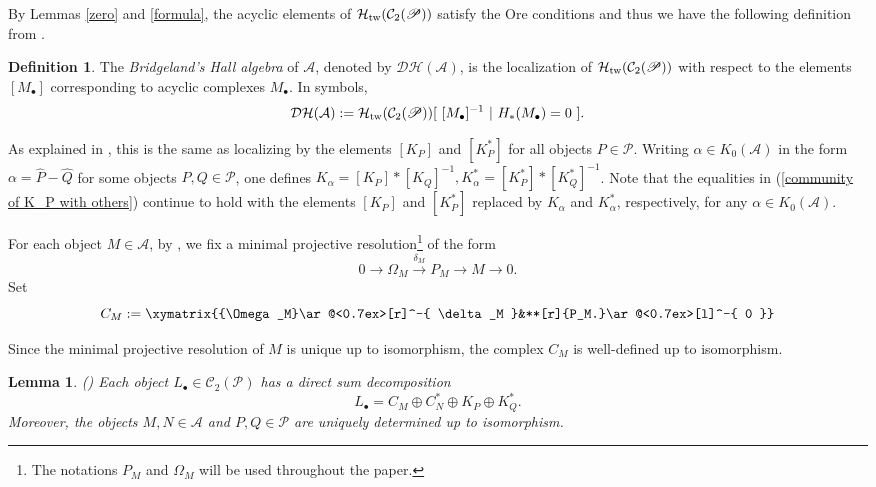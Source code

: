 \documentclass[reqno,12pt]{amsart}
\numberwithin{equation}{section}
\def\A{{\mathcal A}}\def\P{{\mathscr{P}}}
\theoremstyle{plain} %
\newtheorem{lemma}[theorem]{\bf Lemma}
\theoremstyle{definition} %
\newtheorem{definition}[theorem]{\bf Definition}
\begin{document}
By Lemmas \ref{zero} and \ref{formula}, the acyclic elements of $\mathcal {H}_{\rm{tw}}(\mathcal{C}_2(\mathscr{P}))$ satisfy the Ore conditions and thus we  have the following definition from \cite{Br}.
\begin{definition}
The \emph{Bridgeland's Hall algebra} of $\mathcal{A}$, denoted by $\mathcal {D}\mathcal {H}(\mathcal{A})$, is the localization of $\mathcal {H}_{\rm{tw}}(\mathcal{C}_2(\mathscr{P}))$ with respect to the elements $[M_\bullet]$ corresponding to acyclic complexes $M_\bullet$. In symbols, $$\mathcal {D}\mathcal {H}(\mathcal{A}):=\mathcal {H}_{\rm{tw}}(\mathcal{C}_2(\mathscr{P}))[~[M_\bullet]^{-1}~|~H_\ast(M_\bullet)=0~].$$
\end{definition}
As explained in \cite{Br}, this is the same as localizing by the elements $[K_P]$ and $[K_P^\ast]$ for all objects $P \in \mathscr{P}.$
Writing $\alpha \in K_0(\mathcal{A})$ in the form $\alpha = \hat{P}-\hat{Q}$ for some objects $P,Q \in \mathscr{P}$, one defines $K_\alpha = [K_P]\ast[K_Q]^{-1}, K_\alpha^\ast = [K_P^\ast]\ast[K_Q^\ast]^{-1}$. Note that the equalities in (\ref{community of K_P with others}) continue to hold with the elements $[K_P]$ and $[K_P^\ast]$ replaced by $K_\alpha$ and $K_\alpha^\ast$, respectively, for any $\alpha \in K_0(\mathcal{A})$.

For each object $M \in \mathcal{A}$, by \cite[Lemma 4.1]{Br}, we fix a minimal projective resolution\footnote{The notations $P_M$ and $\Omega_M$ will be used throughout the paper.} of the form
\begin{equation}\label{projective resolution}
0 \longrightarrow \Omega_M \stackrel{\delta_M}{\longrightarrow} P_M \longrightarrow M \longrightarrow 0.
\end{equation}
Set \begin{equation*}\label{C_A}
C_M:=\xymatrix{{\Omega_M}\ar@<0.7ex>[r]^-{
  \delta_M
}&**[r]{P_M.}\ar@<0.7ex>[l]^-{
  0
}}
\end{equation*}




Since the minimal projective resolution of $M$ is unique up to isomorphism, the complex $C_M$ is well-defined up to isomorphism.
\begin{lemma}{\rm(\cite[Lemma 4.2]{Br})}
Each object ${L_\bullet}\in\mathcal{C}_2(\mathscr{P})$ has a direct sum decomposition
$$L_\bullet=C_M\oplus C_N^\ast\oplus K_P\oplus K_Q^\ast.$$
Moreover, the objects $M,N\in\A$ and $P,Q\in\P$ are uniquely determined up to isomorphism.
\end{lemma}
\end{document}
